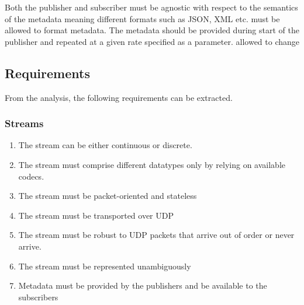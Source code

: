 Both the publisher and subscriber must be agnostic with respect to the semantics of the metadata meaning different formats such as JSON, XML etc. must be allowed to format metadata. The metadata should be provided during start of the publisher and repeated at a given rate specified as a parameter.  allowed to change



\subsection{Requirements}
From the analysis, the following requirements can be extracted.
\subsubsection{Streams}
\begin{enumerate}
	\item The stream can be either continuous or discrete.
	\item The stream must comprise different datatypes only by relying on available codecs.
	\item The stream must be packet-oriented and stateless
	\item The stream must be transported over UDP
	\item The stream must be robust to UDP packets that arrive out of order or never arrive.
	\item The stream must be represented unambiguously
	\item Metadata must be provided by the publishers and be available to the subscribers 
\end{enumerate}

